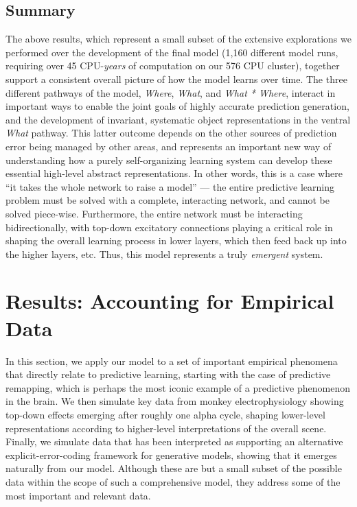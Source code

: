 \documentclass[11pt,twoside]{article}
\newif\myifpdf
\begin{document}
\subsection{Summary}

The above results, which represent a small subset of the extensive explorations we performed over the development of the final model (1,160 different model runs, requiring over 45 CPU-{\em years} of computation on our 576 CPU cluster), together support a consistent overall picture of how the model learns over time.  The three different pathways of the model, {\em Where}, {\em What}, and {\em What * Where}, interact in important ways to enable the joint goals of highly accurate prediction generation, and the development of invariant, systematic object representations in the ventral {\em What} pathway.  This latter outcome depends on the other sources of prediction error being managed by other areas, and represents an important new way of understanding how a purely self-organizing learning system can develop these essential high-level abstract representations.  In other words, this is a case where ``it takes the whole network to raise a model'' --- the entire predictive learning problem must be solved with a complete, interacting network, and cannot be solved piece-wise.  Furthermore, the entire network must be interacting bidirectionally, with top-down excitatory connections playing a critical role in shaping the overall learning process in lower layers, which then feed back up into the higher layers, etc.  Thus, this model represents a truly {\em emergent} system.

\section{Results: Accounting for Empirical Data}

In this section, we apply our model to a set of important empirical phenomena that directly relate to predictive learning, starting with the case of predictive remapping, which is perhaps the most iconic example of a predictive phenomenon in the brain.  We then simulate key data from monkey electrophysiology showing top-down effects emerging after roughly one alpha cycle, shaping lower-level representations according to higher-level interpretations of the overall scene.  Finally, we simulate data that has been interpreted as supporting an alternative explicit-error-coding framework for generative models, showing that it emerges naturally from our model.  Although these are but a small subset of the possible data within the scope of such a comprehensive model, they address some of the most important and relevant data.
\end{document}
